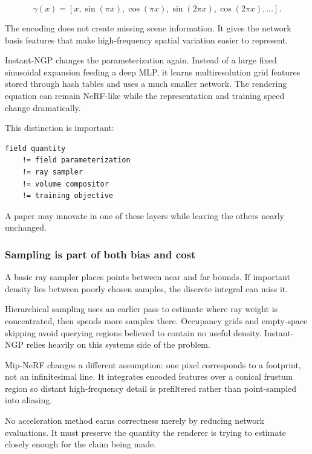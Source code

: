 \[\gamma(x)=\left[x,\sin(\pi x),\cos(\pi x),\sin(2\pi x),\cos(2\pi x),\ldots\right].\]

The encoding does not create missing scene information. It gives the network basis features that make high-frequency spatial variation easier to represent.

Instant-NGP changes the parameterization again. Instead of a large fixed sinusoidal expansion feeding a deep MLP, it learns multiresolution grid features stored through hash tables and uses a much smaller network. The rendering equation can remain NeRF-like while the representation and training speed change dramatically.

This distinction is important:

\begin{verbatim}
field quantity
    != field parameterization
    != ray sampler
    != volume compositor
    != training objective
\end{verbatim}

A paper may innovate in one of these layers while leaving the others nearly unchanged.

\subsubsection{Sampling is part of both bias and cost}\label{04-visual-computing-ii-ch035-sampling-is-part-of-both-bias-and-cost}

\hypertarget{04-visual-computing-ii-ch035-sampling-is-part-of-both-bias-and-cost}{}

A basic ray sampler places points between near and far bounds. If important density lies between poorly chosen samples, the discrete integral can miss it.

Hierarchical sampling uses an earlier pass to estimate where ray weight is concentrated, then spends more samples there. Occupancy grids and empty-space skipping avoid querying regions believed to contain no useful density. Instant-NGP relies heavily on this systems side of the problem.

Mip-NeRF changes a different assumption: one pixel corresponds to a footprint, not an infinitesimal line. It integrates encoded features over a conical frustum region so distant high-frequency detail is prefiltered rather than point-sampled into aliasing.

No acceleration method earns correctness merely by reducing network evaluations. It must preserve the quantity the renderer is trying to estimate closely enough for the claim being made.

